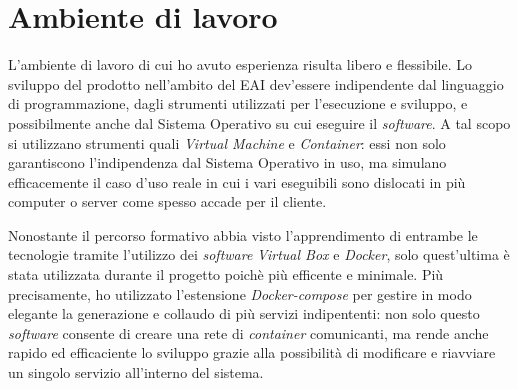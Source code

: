 \section{Ambiente di lavoro}

L'ambiente di lavoro di cui ho avuto esperienza risulta libero e flessibile.
Lo sviluppo del prodotto nell'ambito del EAI dev'essere indipendente dal linguaggio di programmazione, dagli strumenti utilizzati per l'esecuzione e sviluppo, e possibilmente anche dal Sistema Operativo su cui eseguire il \textit{software}.
A tal scopo si utilizzano strumenti quali \textit{Virtual Machine} e \textit{Container}: essi non solo garantiscono l'indipendenza dal Sistema Operativo in uso, ma simulano efficacemente il caso d'uso reale in cui i vari eseguibili sono dislocati in più computer o server come spesso accade per il cliente.

Nonostante il percorso formativo abbia visto l'apprendimento di entrambe le tecnologie tramite l'utilizzo dei \textit{software} \textit{Virtual Box} e \textit{Docker}, solo quest'ultima è stata utilizzata durante il progetto poichè più efficente e minimale.
Più precisamente, ho utilizzato l'estensione \textit{Docker-compose} per gestire in modo elegante la generazione e collaudo di più servizi indipententi: non solo questo \textit{software} consente di creare una rete di \textit{container} comunicanti, ma rende anche rapido ed efficaciente lo sviluppo grazie alla possibilità di modificare e riavviare un singolo servizio all'interno del sistema.
